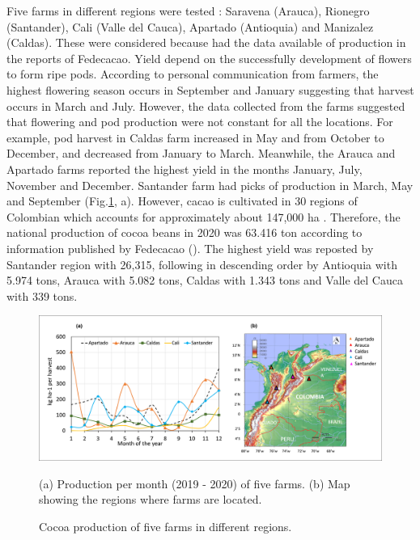 \documentclass[gene,journal,article,submit,moreauthors,pdftex]{Definitions/mdpi}
\begin{document}
{\color{olive} Five farms in different regions were tested : Saravena (Arauca), Rionegro (Santander), Cali (Valle del Cauca), Apartado (Antioquia) and Manizalez (Caldas). These were considered because had the data available of production in the reports of  Fedecacao. Yield depend on the successfully development of flowers to form ripe pods. } {\color{red}  According to personal communication from farmers, the highest flowering season occurs in September and January suggesting that harvest occurs in March and July. However, the data collected from the farms suggested that flowering and pod production were not constant for all the locations. For example, pod harvest in Caldas farm increased in May and from October to December, and decreased from January to March.  Meanwhile, the Arauca and Apartado farms reported the highest yield in the months January, July, November and December. Santander farm had picks of production in March, May and September (Fig.\ref{fig:yield}, a).} {\color{olive} However,  cacao is cultivated in 30 regions of Colombian which accounts for approximately about 147,000 ha \citep{Meza2021}. Therefore, the national production of cocoa beans in 2020 was  63.416 ton according  to  information  published by Fedecacao (\citep{Fede2021}). The highest yield was reposted by Santander region with 26,315,  following in descending order by Antioquia with 5.974 tons, Arauca with 5.082 tons, Caldas with 1.343 tons and Valle del Cauca with 339 tons.} 


\begin{figure}[h]
	\centering
	\includegraphics[scale=0.3]{images/map.png}\\
	\caption{\footnotesize {Cocoa production  of five farms in different regions.\\}}
	\label{fig:yield}
	{\footnotesize (a) Production per month (2019 - 2020) of five farms. (b) Map showing the regions where farms are located.}
\end{figure}
\newpage
\end{document}
